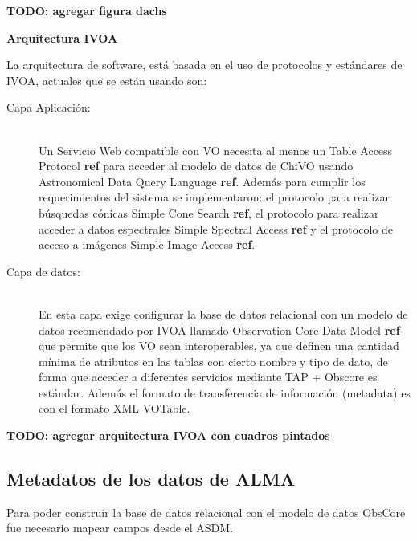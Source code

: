 \textbf{TODO: agregar figura dachs}

\textbf{Arquitectura IVOA}

La arquitectura de software, está basada en el uso de protocolos y estándares de
IVOA, actuales que se están usando son:

\begin{description}
    \item[Capa Aplicación:] \hfill \\
        Un Servicio Web compatible con VO necesita al menos un Table Access Protocol
        \textbf{ref} para acceder al modelo de datos de ChiVO usando Astronomical
        Data Query Language \textbf{ref}. Además para cumplir los requerimientos del
        sistema se implementaron: el protocolo para realizar búsquedas cónicas
        Simple Cone Search \textbf{ref}, el protocolo para realizar acceder a datos
        espectrales Simple Spectral Access \textbf{ref} y el protocolo de acceso a
        imágenes Simple Image Access \textbf{ref}.

    \item[Capa de datos:] \hfill \\
        En esta capa exige configurar la base de datos relacional con un modelo de
        datos recomendado por IVOA llamado Observation Core Data Model \textbf{ref}
        que permite que los VO sean interoperables, ya que definen una cantidad
        mínima de atributos en las tablas con cierto nombre y tipo de dato, de forma
        que acceder a diferentes servicios mediante TAP + Obscore es estándar.
        Además el formato de transferencia de información (metadata) es con el
        formato XML VOTable.
\end{description}

\textbf{TODO: agregar arquitectura IVOA con cuadros pintados}

\subsection{Metadatos de los datos de ALMA}

Para poder construir la base de datos relacional con el modelo de datos ObsCore fue
necesario mapear campos desde el ASDM.

